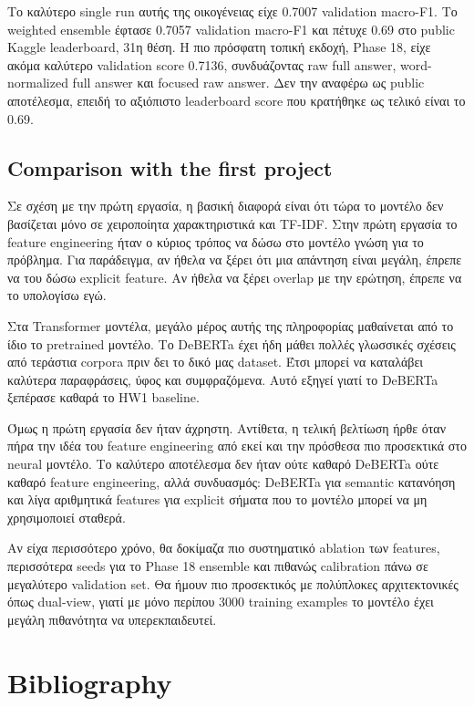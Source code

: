 \documentclass[12pt]{fphw}
\begin{document}
Το καλύτερο single run αυτής της οικογένειας είχε 0.7007 validation macro-F1. Το weighted ensemble έφτασε 0.7057 validation macro-F1 και πέτυχε 0.69 στο public Kaggle leaderboard, 31η θέση. Η πιο πρόσφατη τοπική εκδοχή, Phase 18, είχε ακόμα καλύτερο validation score 0.7136, συνδυάζοντας raw full answer, word-normalized full answer και focused raw answer. Δεν την αναφέρω ως public αποτέλεσμα, επειδή το αξιόπιστο leaderboard score που κρατήθηκε ως τελικό είναι το 0.69.

\subsection{Comparison with the first project}

Σε σχέση με την πρώτη εργασία, η βασική διαφορά είναι ότι τώρα το μοντέλο δεν βασίζεται μόνο σε χειροποίητα χαρακτηριστικά και TF-IDF. Στην πρώτη εργασία το feature engineering ήταν ο κύριος τρόπος να δώσω στο μοντέλο γνώση για το πρόβλημα. Για παράδειγμα, αν ήθελα να ξέρει ότι μια απάντηση είναι μεγάλη, έπρεπε να του δώσω explicit feature. Αν ήθελα να ξέρει overlap με την ερώτηση, έπρεπε να το υπολογίσω εγώ.

Στα Transformer μοντέλα, μεγάλο μέρος αυτής της πληροφορίας μαθαίνεται από το ίδιο το pretrained μοντέλο. Το DeBERTa έχει ήδη μάθει πολλές γλωσσικές σχέσεις από τεράστια corpora πριν δει το δικό μας dataset. Έτσι μπορεί να καταλάβει καλύτερα παραφράσεις, ύφος και συμφραζόμενα. Αυτό εξηγεί γιατί το DeBERTa ξεπέρασε καθαρά το HW1 baseline.

Όμως η πρώτη εργασία δεν ήταν άχρηστη. Αντίθετα, η τελική βελτίωση ήρθε όταν πήρα την ιδέα του feature engineering από εκεί και την πρόσθεσα πιο προσεκτικά στο neural μοντέλο. Το καλύτερο αποτέλεσμα δεν ήταν ούτε καθαρό DeBERTa ούτε καθαρό feature engineering, αλλά συνδυασμός: DeBERTa για semantic κατανόηση και λίγα αριθμητικά features για explicit σήματα που το μοντέλο μπορεί να μη χρησιμοποιεί σταθερά.

Αν είχα περισσότερο χρόνο, θα δοκίμαζα πιο συστηματικό ablation των features, περισσότερα seeds για το Phase 18 ensemble και πιθανώς calibration πάνω σε μεγαλύτερο validation set. Θα ήμουν πιο προσεκτικός με πολύπλοκες αρχιτεκτονικές όπως dual-view, γιατί με μόνο περίπου 3000 training examples το μοντέλο έχει μεγάλη πιθανότητα να υπερεκπαιδευτεί.

\section{Bibliography}



\end{document}
